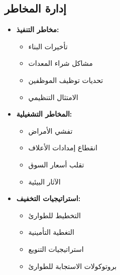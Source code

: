 \subsection{إدارة المخاطر}
\begin{itemize}
    \item \textbf{مخاطر التنفيذ:}
    \begin{itemize}
        \item تأخيرات البناء
        \item مشاكل شراء المعدات
        \item تحديات توظيف الموظفين
        \item الامتثال التنظيمي
    \end{itemize}
    
    \item \textbf{المخاطر التشغيلية:}
    \begin{itemize}
        \item تفشي الأمراض
        \item انقطاع إمدادات الأعلاف
        \item تقلب أسعار السوق
        \item الآثار البيئية
    \end{itemize}
    
    \item \textbf{استراتيجيات التخفيف:}
    \begin{itemize}
        \item التخطيط للطوارئ
        \item التغطية التأمينية
        \item استراتيجيات التنويع
        \item بروتوكولات الاستجابة للطوارئ
    \end{itemize}
\end{itemize}

